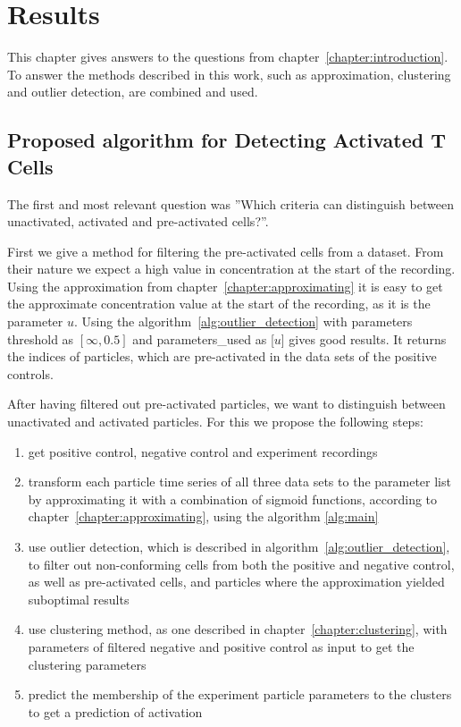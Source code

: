 \chapter{Results}
\label{chapter:results}

This chapter gives answers to the questions from chapter~\ref{chapter:introduction}. To answer the methods described in this work, such as approximation, clustering and outlier detection, are combined and used.

\section{Proposed algorithm for Detecting Activated T Cells}
\label{sec:proposed-algorithm}

The first and most relevant question was ''Which criteria can distinguish between unactivated, activated and pre-activated cells?''.

First we give a method for filtering the pre-activated cells from a dataset. From their nature we expect a high value in \Calcium concentration at the start of the recording. Using the approximation from chapter~\ref{chapter:approximating} it is easy to get the approximate \Calcium concentration value at the start of the recording, as it is the parameter $u$. Using the algorithm~\ref{alg:outlier_detection} with parameters threshold as $[\infty, 0.5]$ and parameters\_used as [$u$] gives good results. It returns the indices of particles, which are pre-activated in the data sets of the positive controls.

After having filtered out pre-activated particles, we want to distinguish between unactivated and activated particles. For this we propose the following steps:

\begin{enumerate}
	\item get positive control, negative control and experiment recordings
	\item transform each particle time series of all three data sets to the parameter list by approximating it with a combination of sigmoid functions, according to chapter~\ref{chapter:approximating}, using the algorithm \ref{alg:main}
	\item use outlier detection, which is described in algorithm~\ref{alg:outlier_detection}, to filter out non-conforming cells from both the positive and negative control, as well as pre-activated cells, and particles where the approximation yielded suboptimal results
	\item use clustering method, as one described in chapter~\ref{chapter:clustering}, with parameters of filtered negative and positive control as input to get the clustering parameters
	\item predict the membership of the experiment particle parameters to the clusters to get a prediction of activation
\end{enumerate}

